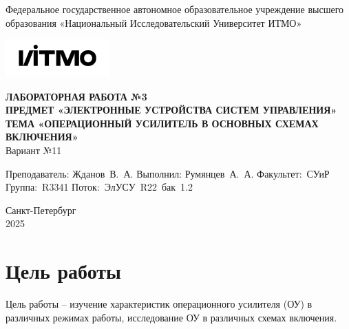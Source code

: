 \documentclass[a4paper, 12pt]{article}
\begin{document}
    \begin{titlepage}

        \begin{center}
        Федеральное государственное автономное образовательное учреждение высшего образования
        «Национальный Исследовательский Университет ИТМО»
        \vfill
        
        \includegraphics[width=0.3\textwidth]{itmo.png} %

        {\large\bf ЛАБОРАТОРНАЯ РАБОТА №3}\\
        {\large\bf ПРЕДМЕТ «ЭЛЕКТРОННЫЕ УСТРОЙСТВА СИСТЕМ УПРАВЛЕНИЯ»}\\
        {\large\bf ТЕМА «ОПЕРАЦИОННЫЙ УСИЛИТЕЛЬ В ОСНОВНЫХ СХЕМАХ ВКЛЮЧЕНИЯ»}\\
        Вариант №11
        \vfill

        \begin{flushright}
            \begin{minipage}{.45\textwidth}
            {
                \hbox{Преподаватель:}
                \hbox{Жданов В. А.}
                \hbox{}
                \hbox{Выполнил:}
                \hbox{Румянцев А. А.}
                \hbox{}
                \hbox{Факультет: СУиР}
                \hbox{Группа: R3341}
                \hbox{Поток: ЭлУСУ R22 бак 1.2}
            }
            \end{minipage}
        \end{flushright}
        \vfill
  
        Санкт-Петербург\\
        2025
        \end{center}
    \end{titlepage}
    
    \tableofcontents

    \newpage
    \section{Цель работы}
    Цель работы -- изучение характеристик операционного усилителя
    (ОУ) в различных режимах работы, исследование ОУ в различных схемах включения.

    
\end{document}
